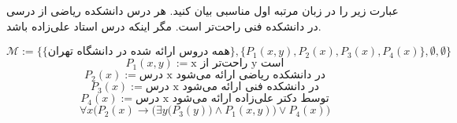 عبارت زیر را در زبان مرتبه اول مناسبی بیان کنید.  
هر درس دانشکده ریاضی از درسی در دانشکده فنی راحت‌تر است. مگر اینکه درس استاد علی‌زاده باشد.
\quad\vspace{0.5 cm}	
\begin{ans}
	$$
		\mathcal{M} := \{\{\text{همه دروس ارائه شده در دانشگاه تهران}\}, \{P_1(x, y), P_2(x), P_3(x), P_4(x)\}, \emptyset, \emptyset\}
	$$
	$$
		{P_1}(x, y) := \text {x راحت‌تر از y است}
	$$
	$$
		{P_2}(x) := \text{درس x در دانشکده ریاضی ارائه می‌شود}
	$$
	$$
		{P_3}(x) := \text{درس x در دانشکده فنی ارائه می‌شود}
	$$
	$$
		{P_4}(x) := \text{درس x توسط دکتر علی‌زاده ارائه می‌شود}
	$$
	$$
		\forall x \Big({P_2}(x) \rightarrow {\Big(\exists y \Big({P_3}(y) \Big) \wedge {P_1}(x, y)\Big)} \vee {P_4}(x)\Big)
	$$
\end{ans}

